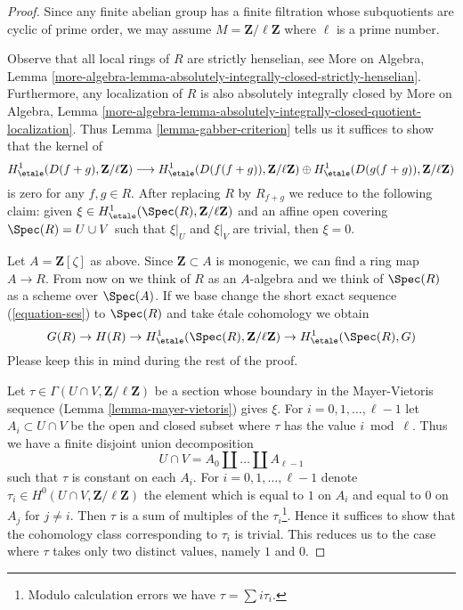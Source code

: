 \begin{proof}
Since any finite abelian group has a finite filtration whose
subquotients are cyclic of prime order, we may assume
$M = \mathbf{Z}/\ell\mathbf{Z}$ where $\ell$ is a prime number.

\medskip\noindent
Observe that all local rings of $R$ are strictly henselian, see
More on Algebra, Lemma
\ref{more-algebra-lemma-absolutely-integrally-closed-strictly-henselian}.
Furthermore, any localization of $R$ is also absolutely integrally closed
by More on Algebra, Lemma
\ref{more-algebra-lemma-absolutely-integrally-closed-quotient-localization}.
Thus Lemma \ref{lemma-gabber-criterion} tells us it suffices to
show that the kernel of
$$
H^1_\etale(D(f + g), \mathbf{Z}/\ell\mathbf{Z})
\longrightarrow
H^1_\etale(D(f(f + g)), \mathbf{Z}/\ell\mathbf{Z}) \oplus
H^1_\etale(D(g(f + g)), \mathbf{Z}/\ell\mathbf{Z})
$$
is zero for any $f, g \in R$. After replacing $R$ by $R_{f + g}$ we
reduce to the following claim: given
$\xi \in H^1_\etale(\Spec(R), \mathbf{Z}/\ell\mathbf{Z})$
and an affine open covering $\Spec(R) = U \cup V$
such that $\xi|_U$ and $\xi|_V$ are trivial, then $\xi = 0$.

\medskip\noindent
Let $A = \mathbf{Z}[\zeta]$ as above.
Since $\mathbf{Z} \subset A$ is monogenic, we can find a ring
map $A \to R$. From now on we think of $R$ as an $A$-algebra
and we think of $\Spec(R)$ as a scheme over $\Spec(A)$.
If we base change the short exact sequence (\ref{equation-ses})
to $\Spec(R)$ and take \'etale cohomology we obtain
$$
G(R) \to H(R) \to
H^1_\etale(\Spec(R), \mathbf{Z}/\ell\mathbf{Z}) \to
H^1_\etale(\Spec(R), G)
$$
Please keep this in mind during the rest of the proof.

\medskip\noindent
Let $\tau \in \Gamma(U \cap V, \mathbf{Z}/\ell\mathbf{Z})$
be a section whose boundary in the Mayer-Vietoris sequence
(Lemma \ref{lemma-mayer-vietoris}) gives $\xi$.
For $i = 0, 1, \ldots, \ell - 1$ let $A_i \subset U \cap V$
be the open and closed subset where $\tau$ has the value $i \bmod \ell$.
Thus we have a finite disjoint union decomposition
$$
U \cap V = A_0 \amalg \ldots \amalg A_{\ell - 1}
$$
such that $\tau$ is constant on each $A_i$. For
$i = 0, 1, \ldots, \ell - 1$
denote $\tau_i \in H^0(U \cap V, \mathbf{Z}/\ell\mathbf{Z})$
the element which is equal to $1$ on $A_i$ and
equal to $0$ on $A_j$ for $j \not = i$.
Then $\tau$ is a sum of multiples of the $\tau_i$\footnote{Modulo
calculation errors we have $\tau = \sum i \tau_i$.}.
Hence it suffices to show that the cohomology class corresponding
to $\tau_i$ is trivial. This reduces us to the case where
$\tau$ takes only two distinct values, namely $1$ and $0$.


\end{proof}
